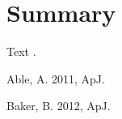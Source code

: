 \documentclass{article}
\begin{document}
\section{Summary}
Text \cite{a}.

 Able, A. 2011, ApJ.

 Baker, B. 2012, ApJ.
\end{document}

